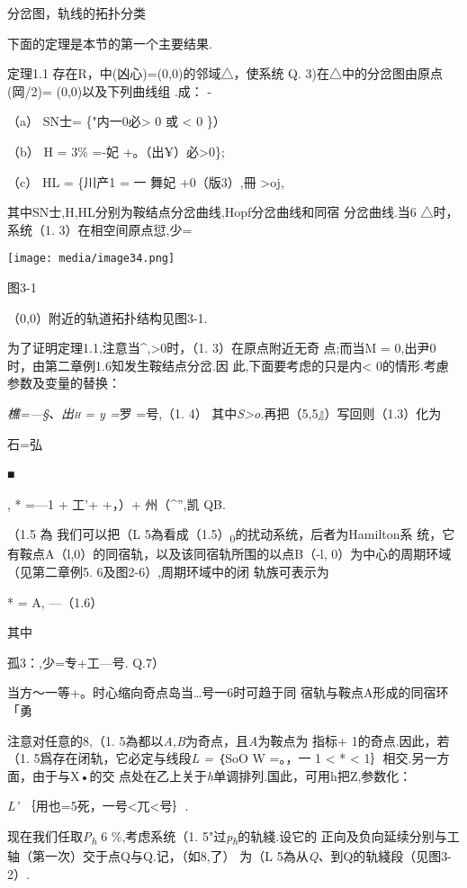 \documentclass{article}
\begin{document}
分岔图，轨线的拓扑分类

下面的定理是本节的第一个主要结果.

定理1.1 存在R，中(凶心)=(0,0)的邻域△，使系统 Q.
3)在△中的分岔图由原点(岡/2)= (0,0)以及下列曲线组 .成： -

（a） SN士= \{"\textbar{}内一0必\textgreater{} 0 或 \textless{} 0 \}）

（b） H = 3\% =-妃 +。（出¥）必\textgreater{}0\};

（c） HL = \{川产1 = 一 舞妃 +0（版3）,冊 \textgreater{}oj,

其中SN士,H,HL分别为鞍结点分岔曲线,Hopf分岔曲线和同宿 分岔曲线.当6
△时，系统（1. 3）在相空间原点愆,少=

\texttt{[image: media/image34.png]}

图3-1

（0,0）附近的轨道拓扑结构见图3-1.

为了证明定理1.1,注意当\^{},\textgreater{}0时，（1. 3）在原点附近无奇
点;而当M = 0,出尹0时，由第二章例1.6知发生鞍结点分岔.因
此,下面要考虑的只是内\textless{} 0的情形.考慮参数及变量的替换：

\emph{樵=---§、出\textsc{h =} y =}罗 =号,（1. 4）
其中\emph{S\textgreater{}o.}再把（5,5』）写回则（1.3）化为

石=弘

■

, * =---1 + 工'+ +，）+ 州（\^{}'',凯 QB.

（1.5 為 我们可以把（L
5為看成（1.5）\textsubscript{0}的扰动系统，后者为Hamilton系
统，它有鞍点A（l,0）的同宿轨，以及该同宿轨所围的以点B（-l,
0）为中心的周期环域（见第二章例5. 6及图2-6）,周期环域中的闭 轨族可表示为

* = A, ---（1.6）

其中

孤3：,少=专+工---号. Q.7）

当方〜一等+。时心缩向奇点岛当\ldots{}号一6时可趋于同
宿轨与鞍点A形成的同宿环「勇

注意对任意的8,（1. 5為都以\emph{A,B}为奇点，且\emph{A}为鞍点为 指标+
1的奇点.因此，若（1. 5爲存在闭轨，它必定与线段\emph{L =} ｛SoO W =。，一
1 \textless{} * \textless{} 1｝相交.另一方面，由于与X•的交
点处在乙上关于\emph{h}单调排列.国此，可用h把Z,参数化：

\emph{L'} ｛用也=5死，一号\textless{}兀\textless{}号｝.

现在我们任取\emph{P\textsubscript{h}} 6 \%,考虑系统（1.
5"过\emph{p\textsubscript{h}}的轨綫.设它的
正向及负向延续分别与工轴（第一次）交于点Q与Q.记，（如8,了） 为（L
5為从\emph{Q、}到Q的轨綫段（见图3-2）.
\end{document}

